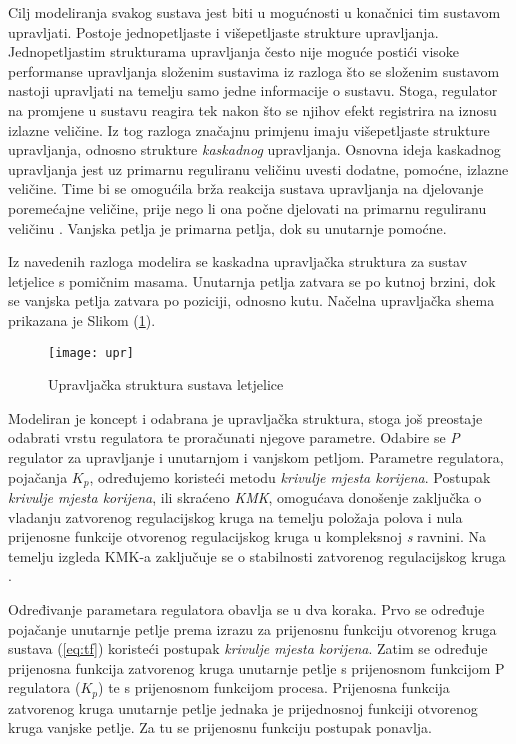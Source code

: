 \documentclass[11pt,a4paper]{article}
\begin{document}
Cilj modeliranja svakog sustava jest biti u mogućnosti u konačnici tim sustavom upravljati. Postoje jednopetljaste i višepetljaste strukture upravljanja. Jednopetljastim strukturama upravljanja često nije moguće postići visoke performanse upravljanja složenim sustavima iz razloga što se složenim sustavom nastoji upravljati na temelju samo jedne informacije o sustavu. Stoga, regulator na promjene u sustavu reagira tek nakon što se njihov efekt registrira na iznosu izlazne veličine. Iz tog razloga značajnu primjenu imaju višepetljaste strukture upravljanja, odnosno strukture \textit{kaskadnog} upravljanja. Osnovna ideja kaskadnog upravljanja jest uz primarnu reguliranu veličinu uvesti dodatne, pomoćne, izlazne veličine. Time bi se omogućila brža reakcija sustava upravljanja na djelovanje poremećajne veličine, prije nego li ona počne djelovati na primarnu reguliranu veličinu \cite{uemp}. Vanjska petlja je primarna petlja, dok su unutarnje pomoćne.   

\medskip

Iz navedenih razloga modelira se kaskadna upravljačka struktura za sustav letjelice s pomičnim masama. Unutarnja petlja zatvara se po kutnoj brzini, dok se vanjska petlja zatvara po poziciji, odnosno kutu. Načelna upravljačka shema prikazana je Slikom (\ref{fig:upr}). 


\begin{figure}[H]
	\centering
	\texttt{[image: upr]}
	\caption{Upravljačka struktura sustava letjelice}
	\label{fig:upr}
\end{figure}

Modeliran je koncept i odabrana je upravljačka struktura, stoga još preostaje odabrati vrstu regulatora te proračunati njegove parametre. Odabire se \textit{P} regulator za upravljanje i unutarnjom i vanjskom petljom. Parametre regulatora, pojačanja $K_{p}$, određujemo koristeći metodu \textit{krivulje mjesta korijena}. Postupak \textit{krivulje mjesta korijena}, ili skraćeno \textit{KMK}, omogućava donošenje zaključka o vladanju zatvorenog regulacijskog kruga na temelju položaja polova i nula prijenosne funkcije otvorenog regulacijskog kruga u kompleksnoj \textit{s} ravnini. Na temelju izgleda KMK-a zaključuje se o stabilnosti zatvorenog regulacijskog kruga \cite{mato}. 

\medskip

Određivanje parametara regulatora obavlja se u dva koraka. Prvo se određuje pojačanje unutarnje petlje prema izrazu za prijenosnu funkciju otvorenog kruga sustava (\ref{eq:tf}) koristeći postupak \textit{krivulje mjesta korijena}. Zatim se određuje prijenosna funkcija zatvorenog kruga unutarnje petlje s prijenosnom funkcijom P regulatora ($K_{p}$) te s prijenosnom funkcijom procesa. Prijenosna funkcija zatvorenog  kruga unutarnje petlje jednaka je prijednosnoj funkciji otvorenog kruga vanjske petlje. Za tu se prijenosnu funkciju postupak ponavlja.  
\end{document}
